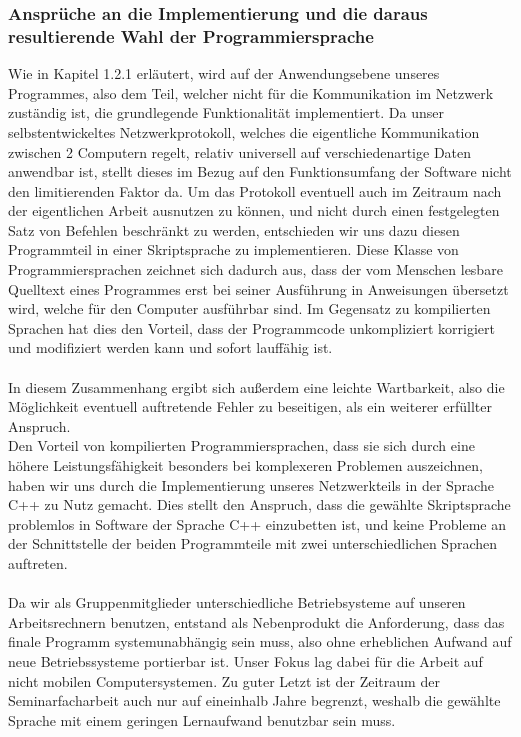 \subsubsection{Ansprüche an die Implementierung und die daraus resultierende Wahl der Programmiersprache}
Wie in Kapitel 1.2.1 erläutert, wird auf der Anwendungsebene unseres Programmes, also dem Teil, welcher nicht für die Kommunikation im Netzwerk zuständig ist, die grundlegende Funktionalität implementiert. Da unser selbstentwickeltes Netzwerkprotokoll, welches die eigentliche Kommunikation zwischen 2 Computern regelt, relativ universell auf verschiedenartige Daten anwendbar ist, stellt dieses im Bezug auf den Funktionsumfang der Software nicht den limitierenden Faktor da. Um das Protokoll eventuell auch im Zeitraum nach der eigentlichen Arbeit ausnutzen zu können, und nicht durch einen festgelegten Satz von Befehlen beschränkt zu werden, entschieden wir uns dazu diesen Programmteil in einer Skriptsprache zu implementieren.
Diese Klasse von Programmiersprachen zeichnet sich dadurch aus, dass der vom Menschen lesbare Quelltext eines Programmes erst bei seiner Ausführung in Anweisungen übersetzt wird, welche für den Computer ausführbar sind. Im Gegensatz zu kompilierten Sprachen hat dies den Vorteil, dass der Programmcode unkompliziert korrigiert und modifiziert werden kann und sofort lauffähig ist.\\\\
In diesem Zusammenhang ergibt sich außerdem eine leichte Wartbarkeit, also die Möglichkeit eventuell auftretende Fehler zu beseitigen, als ein weiterer erfüllter Anspruch.\\
Den Vorteil von kompilierten Programmiersprachen, dass sie sich durch eine höhere Leistungsfähigkeit besonders bei komplexeren Problemen auszeichnen, haben wir uns durch die Implementierung unseres Netzwerkteils in der Sprache C++ zu Nutz gemacht. Dies stellt den Anspruch, dass die gewählte Skriptsprache problemlos in Software der Sprache C++ einzubetten ist, und keine Probleme an der Schnittstelle der beiden Programmteile mit zwei unterschiedlichen Sprachen auftreten.\\\\
Da wir als Gruppenmitglieder unterschiedliche Betriebsysteme auf unseren Arbeitsrechnern benutzen, entstand als Nebenprodukt die Anforderung, dass das finale Programm systemunabhängig sein muss, also ohne erheblichen Aufwand auf neue Betriebssysteme portierbar ist. 
Unser Fokus lag dabei für die Arbeit auf nicht mobilen Computersystemen.
Zu guter Letzt ist der Zeitraum der Seminarfacharbeit auch nur auf eineinhalb Jahre begrenzt, weshalb die gewählte Sprache mit einem geringen Lernaufwand benutzbar sein muss.\\\\
